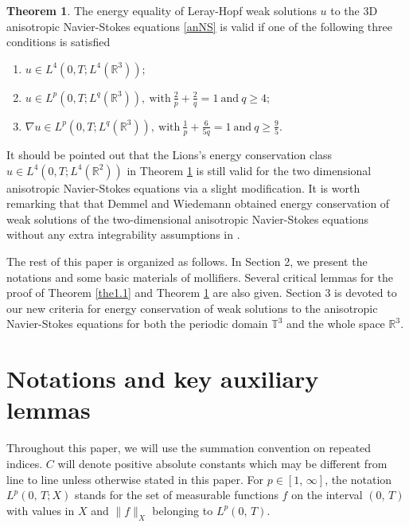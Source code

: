 \documentclass[11pt]{article}
\theoremstyle{plain}\newtheorem{definition}{Definition}[section]
\theoremstyle{definition}\newtheorem{theorem}{Theorem}[section]
\theoremstyle{plain}\newtheorem{lemma}[theorem]{Lemma}
\theoremstyle{plain}\newtheorem{coro}[theorem]{Corollary}
\theoremstyle{plain}\newtheorem{prop}[theorem]{Proposition}
\theoremstyle{remark}\newtheorem{remark}{Remark}[section]
\newcommand{\f}{\frac}
\numberwithin{equation}{section}
\begin{document}
   \begin{theorem}\label{the1.2}
The energy equality of Leray-Hopf weak solutions $u$ to the 3D anisotropic Navier-Stokes equations \eqref{anNS} is valid if one of the following three conditions is satisfied
 \begin{enumerate}[(1)]
 \item  $u \in L^{4}(0,T;L^{4}(\mathbb{R}^{3}));$
 \item $u\in L^{p}(0,T;L^{q}(\mathbb{R}^{3})),~\text{with}~\f{2}{p}+
 \f{2}{q}=1~\text{and}~q\geq 4;$
 \item  $\nabla u \in L^{p}(0, T ; L^{q}(\mathbb{R}^3)),~\text{with}~
 \frac{1}{p}+\frac{6}{5 q}=1~\text{and}~q\geq \frac{9}{5}.$
\end{enumerate}
 \end{theorem}
 It should be pointed out that the Lions's energy conservation class $u \in L^{4}(0,T;L^{4}(\mathbb{R}^{2}))$ in Theorem \ref{the1.2} is still valid for the two dimensional anisotropic Navier-Stokes equations via a slight modification.
It is worth remarking that that Demmel and   Wiedemann obtained    energy conservation of weak solutions of  the two-dimensional anisotropic Navier-Stokes equations   without any extra integrability assumptions in \cite{[DW]}. 





The rest of this  paper is organized as follows. In Section 2,
we present the notations and  some basic materials of mollifiers.
Several critical lemmas for the proof of Theorem \ref{the1.1} and Theorem \ref{the1.2} are also given. Section 3 is devoted to our new criteria for energy conservation of weak solutions to the anisotropic Navier-Stokes equations for both the periodic domain $\mathbb{T}^3$ and the whole space $\mathbb{R}^3$.


\section{Notations and  key auxiliary lemmas} \label{section2}



Throughout this paper, we will use the summation convention on repeated indices. $C$ will denote positive absolute constants which may be different from line to line unless otherwise stated in this paper.  For $p\in [1,\,\infty]$, the notation $L^{p}(0,\,T;X)$ stands for the set of measurable functions $f$ on the interval $(0,\,T)$ with values in $X$ and $\|f\|_{X}$ belonging to $L^{p}(0,\,T)$.
\end{document}
